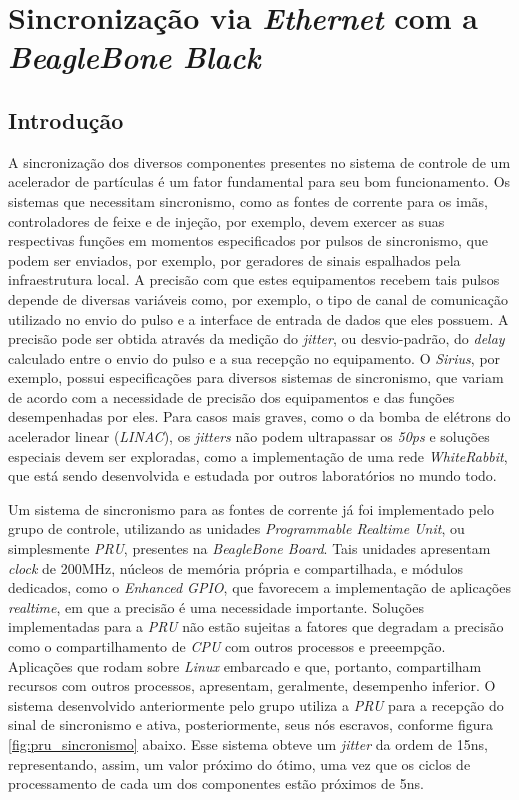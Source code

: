 \section {Sincronização via \textit{Ethernet} com a \textit{BeagleBone Black}}

\subsection {Introdução}

A sincronização dos diversos componentes presentes no sistema de controle de um
acelerador de partículas é um fator fundamental para seu bom funcionamento. Os
sistemas que necessitam sincronismo, como as fontes de corrente para os imãs,
controladores de feixe e de injeção, por exemplo, devem exercer as suas
respectivas funções em momentos especificados por pulsos de sincronismo, que
podem ser enviados, por exemplo, por geradores de sinais espalhados pela
infraestrutura local. A precisão com que estes equipamentos recebem tais pulsos
depende de diversas variáveis como, por exemplo, o tipo de canal de comunicação
utilizado no envio do pulso e a interface de entrada de dados que eles possuem.
A precisão pode ser obtida através da medição do \textit{jitter}, ou
desvio-padrão, do \textit{delay} calculado entre o envio do pulso e a sua
recepção no equipamento.
O \textit{Sirius}, por exemplo, possui especificações para diversos sistemas de
sincronismo, que variam de acordo com a necessidade de precisão dos equipamentos
e das funções desempenhadas por eles. Para casos mais graves, como o da bomba de
elétrons do acelerador linear (\textit{LINAC}), os \textit{jitters} não podem
ultrapassar os \textit{50ps} e soluções especiais devem ser exploradas, como a
implementação de uma rede \textit{WhiteRabbit}, que está sendo
desenvolvida e estudada por outros laboratórios no mundo todo.

\vspace{12pt}

Um sistema de sincronismo para as fontes de corrente já
foi implementado pelo grupo de controle, utilizando as unidades
\textit{Programmable Realtime Unit}, ou simplesmente \textit{PRU}, presentes na
\textit{BeagleBone Board}. Tais unidades apresentam \textit{clock} de 200MHz,
núcleos de memória própria e compartilhada, e módulos dedicados, como o
\textit{Enhanced GPIO}, que favorecem a implementação de aplicações
\textit{realtime}, em que a precisão é uma necessidade importante. Soluções
implementadas para a \textit{PRU} não estão sujeitas a fatores que degradam a
precisão como o compartilhamento de \textit{CPU} com outros
processos e preeempção. Aplicações que rodam sobre \textit{Linux} embarcado e
que, portanto, compartilham recursos com outros processos, apresentam,
geralmente, desempenho inferior. O sistema desenvolvido anteriormente pelo grupo
utiliza a \textit{PRU} para a recepção do sinal de sincronismo e ativa, posteriormente, seus nós
escravos, conforme figura \ref{fig:pru_sincronismo} abaixo. Esse sistema obteve
um \textit{jitter} da ordem de 15ns, representando, assim, um valor próximo do
ótimo, uma vez que os ciclos de processamento de cada um dos componentes estão
próximos de 5ns.

